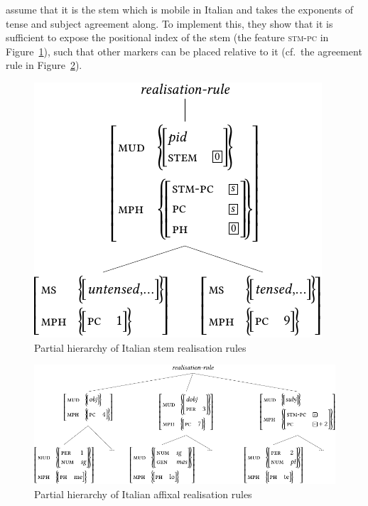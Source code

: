 \citet{Crysmann:Bonami:2016} assume that it is the stem which is
mobile in Italian and takes the exponents of tense and subject
agreement along. To implement this, they show that it is sufficient to
expose the positional index of the stem (the feature \textsc{stm-pc}
in Figure~\ref{fig:ItalianStem}), such that other markers can
be placed relative to it (cf.~the agreement rule in Figure~\ref{fig:ItalianAff}).  

\begin{figure}[htb]\centering
  
  \includegraphics[scale=.9]{figures/italian-stem-crop}
  
  \caption{Partial hierarchy of Italian stem realisation rules}
  \label{fig:ItalianStem}
\end{figure}

\begin{figure}[htb]
  \centering
  \includegraphics[scale=.84]{figures/italian-affix-crop}
  
  \caption{Partial hierarchy of Italian affixal realisation rules}
  \label{fig:ItalianAff}
\end{figure}



